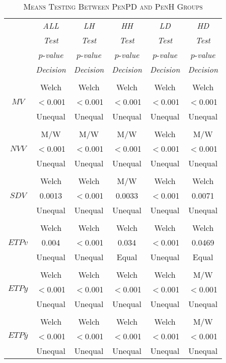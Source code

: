 \begin{table}[h]
\centering
\caption{\textsc{Means Testing Between PenPD and PenH Groups}}
\begin{tabular*}{0.75\textwidth}{@{\extracolsep{\fill}} c | c c c c c}
	& {\textit{ALL}} & {\textit{LH}} & {\textit{HH}} & {\textit{LD}} & {\textit{HD}} \\
	\cline{2-6}  
	& {\textit{Test}} & {\textit{Test}} & {\textit{Test}} & {\textit{Test}} & {\textit{Test}} \\
	& $p$-{\textit{value}} & $p$-{\textit{value}} & $p$-{\textit{value}} & $p$-{\textit{value}} & $p$-{\textit{value}} \\
	& {\textit{Decision}} & {\textit{Decision}} & {\textit{Decision}} & {\textit{Decision}} & {\textit{Decision}} \\
	\hline 	\hline
	\\
	& Welch & Welch & Welch & Welch & Welch \\
	$MV$ & $<$0.001 & $<$0.001 & $<$0.001 & $<$0.001 & $<$0.001 \\
	& Unequal & Unequal & Unequal & Unequal & Unequal \\
	\hline
	\\
	& M/W & M/W & M/W & Welch & M/W \\
	$NVV$ & $<$0.001 & $<$0.001 & $<$0.001 & $<$0.001 & $<$0.001 \\
	& Unequal & Unequal & Unequal & Unequal & Unequal \\
	\hline
	\\
	& Welch & Welch & M/W & Welch & Welch \\
	$SDV$ & 0.0013 & $<$0.001 & 0.0033 & $<$0.001 & 0.0071 \\
	& Unequal & Unequal & Unequal & Unequal & Unequal \\
	\hline
	\\
	& Welch & Welch & Welch & Welch & Welch \\
	$ETPv$ & 0.004 & $<$0.001 & 0.034 & $<$0.001 & 0.0469 \\
	& Unequal & Unequal & Equal & Unequal & Equal \\	
	\hline
	\\
	& Welch & Welch & Welch & Welch & M/W \\
	$ETPy$ & $<$0.001 & $<$0.001 & $<$0.001 & $<$0.001 & $<$0.001 \\
	& Unequal & Unequal & Unequal & Unequal & Unequal \\
	\hline
	\\
	& Welch & Welch & Welch & Welch & M/W \\
	$ETP\bar{y}$ & $<$0.001 & $<$0.001 & $<$0.001 & $<$0.001 & $<$0.001 \\
	& Unequal & Unequal & Unequal & Unequal & Unequal \\
	\hline
\end{tabular*}
\label{table:PenCTMeansInter}
\end{table}
 
